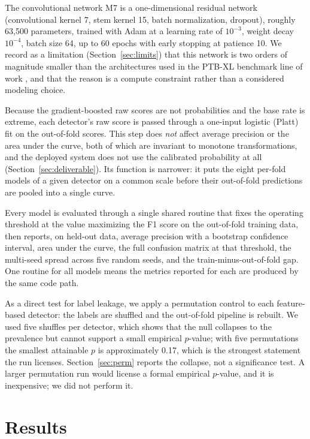 \documentclass[11pt]{article}
\begin{document}
The convolutional network M7 is a one-dimensional residual network (convolutional kernel 7, stem kernel 15, batch normalization, dropout), roughly 63{,}500 parameters, trained with Adam at a learning rate of $10^{-3}$, weight decay $10^{-4}$, batch size 64, up to 60 epochs with early stopping at patience 10. We record as a limitation (Section~\ref{sec:limits}) that this network is two orders of magnitude smaller than the architectures used in the PTB-XL benchmark line of work \cite{strodthoff}, and that the reason is a compute constraint rather than a considered modeling choice.

Because the gradient-boosted raw scores are not probabilities and the base rate is extreme, each detector's raw score is passed through a one-input logistic (Platt) fit on the out-of-fold scores. This step does \emph{not} affect average precision or the area under the curve, both of which are invariant to monotone transformations, and the deployed system does not use the calibrated probability at all (Section~\ref{sec:deliverable}). Its function is narrower: it puts the eight per-fold models of a given detector on a common scale before their out-of-fold predictions are pooled into a single curve.

Every model is evaluated through a single shared routine that fixes the operating threshold at the value maximizing the F1 score on the out-of-fold training data, then reports, on held-out data, average precision with a bootstrap confidence interval, area under the curve, the full confusion matrix at that threshold, the multi-seed spread across five random seeds, and the train-minus-out-of-fold gap. One routine for all models means the metrics reported for each are produced by the same code path.

As a direct test for label leakage, we apply a permutation control to each feature-based detector: the labels are shuffled and the out-of-fold pipeline is rebuilt. We used five shuffles per detector, which shows that the null collapses to the prevalence but cannot support a small empirical $p$-value; with five permutations the smallest attainable $p$ is approximately 0.17, which is the strongest statement the run licenses. Section~\ref{sec:perm} reports the collapse, not a significance test. A larger permutation run would license a formal empirical $p$-value, and it is inexpensive; we did not perform it.

\FloatBarrier
\section{Results}
\label{sec:results}
\end{document}
